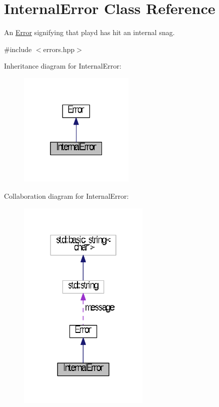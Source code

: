 \hypertarget{classInternalError}{\section{Internal\+Error Class Reference}
\label{classInternalError}
}


An \hyperlink{classError}{Error} signifying that playd has hit an internal snag.  




{\ttfamily \#include $<$errors.\+hpp$>$}



Inheritance diagram for Internal\+Error\+:
\nopagebreak
\begin{figure}[H]
\begin{center}
\leavevmode
\includegraphics[width=157pt]{classInternalError__inherit__graph}
\end{center}
\end{figure}


Collaboration diagram for Internal\+Error\+:
\nopagebreak
\begin{figure}[H]
\begin{center}
\leavevmode
\includegraphics[width=178pt]{classInternalError__coll__graph}
\end{center}
\end{figure}
